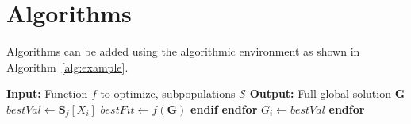 \section{Algorithms}\label{Sect:Alg}
Algorithms can be added using the algorithmic environment as shown in Algorithm~\ref{alg:example}.
\begin{algorithm}[htbp]
\begin{algorithmic}[1]
\STATE \textbf{Input:} Function $f$ to optimize, subpopulations $\mathcal{S}$
\STATE \textbf{Output:} Full global solution $\boldsymbol{G}$
\STATE {}
\STATE {} \label{opa_compete:loop:1}
\STATE {}
\STATE \hspace{8pt}{$bestFit \leftarrow \infty$} \label{opa_compete:init:1}
\STATE {} \label{opa_compete:init:2}
\STATE {}
\STATE {}
\STATE {}
\STATE {} \label{opa_compete:compare:1}
\STATE {}
\STATE {}
\STATE \hspace{24pt}$bestVal \leftarrow \boldsymbol{S}_j[X_i]$
\STATE \hspace{24pt}$bestFit \leftarrow f(\boldsymbol{G})$
\STATE \hspace{16pt}\textbf{endif}
\STATE \hspace{8pt}\textbf{endfor} \label{opa_compete:compare:2}
\STATE {}
\STATE \hspace{8pt}$G_i \leftarrow bestVal$
\STATE \textbf{endfor}
\RETURN
\end{algorithmic}
\caption{Algorithm example}
\label{alg:example}
\end{algorithm} 

